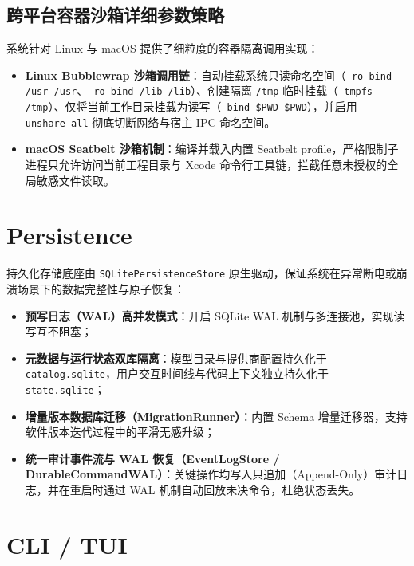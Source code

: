 \documentclass[11pt,a4paper]{article}
\begin{document}
\subsection{跨平台容器沙箱详细参数策略}
系统针对 Linux 与 macOS 提供了细粒度的容器隔离调用实现：
\begin{itemize}
    \item \textbf{Linux Bubblewrap 沙箱调用链}：自动挂载系统只读命名空间（\texttt{--ro-bind /usr /usr}、\texttt{--ro-bind /lib /lib}）、创建隔离 \texttt{/tmp} 临时挂载（\texttt{--tmpfs /tmp}）、仅将当前工作目录挂载为读写（\texttt{--bind \$PWD \$PWD}），并启用 \texttt{--unshare-all} 彻底切断网络与宿主 IPC 命名空间。
    \item \textbf{macOS Seatbelt 沙箱机制}：编译并载入内置 Seatbelt profile，严格限制子进程只允许访问当前工程目录与 Xcode 命令行工具链，拦截任意未授权的全局敏感文件读取。
\end{itemize}

\section{Persistence}

持久化存储底座由 \texttt{SQLitePersistenceStore} 原生驱动，保证系统在异常断电或崩溃场景下的数据完整性与原子恢复：

\begin{itemize}
    \item \textbf{预写日志（WAL）高并发模式}：开启 SQLite WAL 机制与多连接池，实现读写互不阻塞；
    \item \textbf{元数据与运行状态双库隔离}：模型目录与提供商配置持久化于 \texttt{catalog.sqlite}，用户交互时间线与代码上下文独立持久化于 \texttt{state.sqlite}；
    \item \textbf{增量版本数据库迁移（MigrationRunner）}：内置 Schema 增量迁移器，支持软件版本迭代过程中的平滑无感升级；
    \item \textbf{统一审计事件流与 WAL 恢复（EventLogStore / DurableCommandWAL）}：关键操作均写入只追加（Append-Only）审计日志，并在重启时通过 WAL 机制自动回放未决命令，杜绝状态丢失。
\end{itemize}

\section{CLI / TUI}
\end{document}
